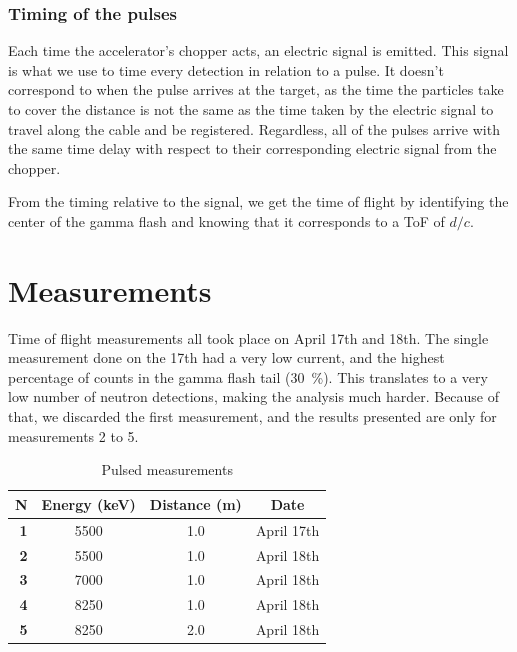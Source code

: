 \documentclass[a4paper,12pt]{report}
\begin{document}
\subsubsection{Timing of the pulses}
Each time the accelerator's chopper acts, an electric signal is emitted.	%
This signal is what we use to time every detection in relation to a pulse.
It doesn't correspond to when the pulse arrives at the target, as the time the particles take to cover the distance is not the same as the time taken by the electric signal to travel along the cable and be registered.
Regardless, all of the pulses arrive with the same time delay with respect to their corresponding electric signal from the chopper.

From the timing relative to the signal, we get the time of flight by identifying the center of the gamma flash and knowing that it corresponds to a ToF of $d/c$.
\\


\section{Measurements}
Time of flight measurements all took place on April 17th and 18th.
The single measurement done on the 17th had a very low current, and the highest percentage of counts in the gamma flash tail (\qty{30}{\percent}).
This translates to a very low number of neutron detections, making the analysis much harder.
Because of that, we discarded the first measurement, and the results presented are only for measurements 2 to 5.

\begin{table}[H]	%
\centering
\begin{tabular}[c]{>{\bfseries}r||c|c|c}
	N& Energy (\unit{\keV}) & Distance (\unit{\meter}) & Date\tablefootnote{All took place in 2023} \\ \hline	%
	1&\num{5500}&\num{1.0}&April 17th\\ \hline
	2&\num{5500}&\num{1.0}&April 18th\\ \hline
	3&\num{7000}&\num{1.0}&April 18th\\ \hline
	4&\num{8250}&\num{1.0}&April 18th\\ \hline
	5&\num{8250}&\num{2.0}&April 18th\\ \hline
\end{tabular}
\caption{Pulsed measurements}
\label{pulsed_measurements_table}
\end{table}
\end{document}
